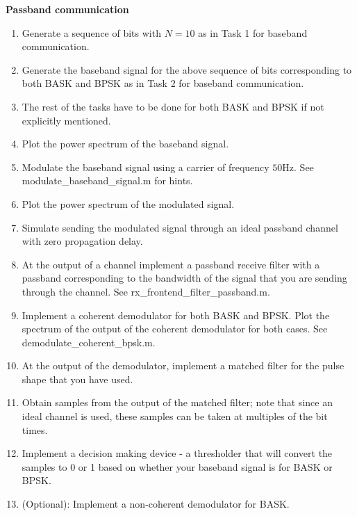 \myhrule 
\noindent
\textbf{Passband communication}
\begin{enumerate}
\item Generate a sequence of bits with $N = 10$ as in Task 1 for baseband communication.
\item Generate the baseband signal for the above sequence of bits corresponding to both BASK and BPSK as in Task 2 for baseband communication.
\item The rest of the tasks have to be done for both BASK and BPSK if not explicitly mentioned.
\item Plot the power spectrum of the baseband signal.
\item Modulate the baseband signal using a carrier of frequency $50$Hz. See modulate\_baseband\_signal.m for hints.
\item Plot the power spectrum of the modulated signal.
\item Simulate sending the modulated signal through an ideal passband channel with zero propagation delay.
\item At the output of a channel implement a passband receive filter with a passband corresponding to the bandwidth of the signal that you are sending through the channel. See rx\_frontend\_filter\_passband.m.
\item Implement a coherent demodulator for both BASK and BPSK. Plot the spectrum of the output of the coherent demodulator for both cases. See demodulate\_coherent\_bpsk.m.
\item At the output of the demodulator, implement a matched filter for the pulse shape that you have used.
\item Obtain samples from the output of the matched filter; note that since an ideal channel is used, these samples can be taken at multiples of the bit times.
\item Implement a decision making device - a thresholder that will convert the samples to 0 or 1 based on whether your baseband signal is for BASK or BPSK.
\item (Optional): Implement a non-coherent demodulator for BASK.
\end{enumerate}
